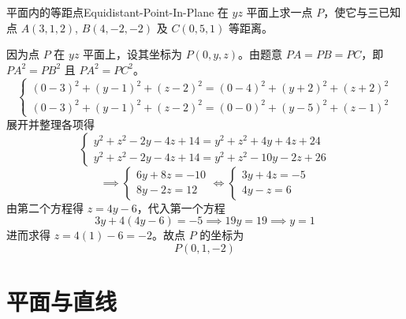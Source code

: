 \begin{problem}{平面内的等距点}{Equidistant-Point-In-Plane}
    在 $yz$ 平面上求一点 $P$，使它与三已知点 $A(3, 1, 2)$, $B(4, -2, -2)$ 及 $C(0, 5, 1)$ 等距离。
\end{problem}

\begin{solution}
    因为点 $P$ 在 $yz$ 平面上，设其坐标为 $P(0, y, z)$。由题意 $PA = PB = PC$，即 $PA^2 = PB^2$ 且 $PA^2 = PC^2$。
    \begin{equation*}
        \begin{cases}
            (0 - 3)^2 + (y - 1)^2 + (z - 2)^2 = (0 - 4)^2 + (y + 2)^2 + (z + 2)^2 \\
            (0 - 3)^2 + (y - 1)^2 + (z - 2)^2 = (0 - 0)^2 + (y - 5)^2 + (z - 1)^2
        \end{cases}
    \end{equation*}
    展开并整理各项得
    \begin{equation*}
        \begin{cases}
            y^2 + z^2 - 2y - 4z + 14 = y^2 + z^2 + 4y + 4z + 24 \\
            y^2 + z^2 - 2y - 4z + 14 = y^2 + z^2 - 10y - 2z + 26
        \end{cases}
    \end{equation*}
    \begin{equation*}
        \implies
        \begin{cases}
            6y + 8z = -10 \\
            8y - 2z = 12
        \end{cases}
        \iff
        \begin{cases}
            3y + 4z = -5 \\
            4y - z = 6
        \end{cases}
    \end{equation*}
    由第二个方程得 $z = 4y - 6$，代入第一个方程
    \begin{equation*}
        3y + 4(4y - 6) = -5 \implies 19y = 19 \implies y = 1
    \end{equation*}
    进而求得 $z = 4(1) - 6 = -2$。故点 $P$ 的坐标为
    \begin{equation*}
        \boxed{P(0, 1, -2)}
    \end{equation*}
\end{solution}


\section{平面与直线}

